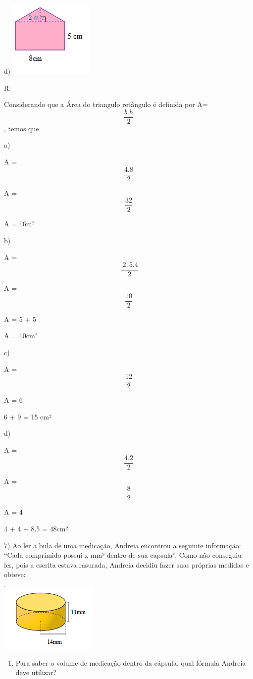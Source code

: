 d)
\includegraphics[width=1.59375in,height=1.46875in]{./imgSAEB_8_MAT/media/image49.png}

R:

Considerando que a Área do triangulo retângulo é definida por A=
\[\frac{b.h}{2}\], temos que

a)

A = \[\frac{4.8}{2}\]

A = \[\frac{32}{2}\]

A = 16m²

b)

A = \[\ \frac{\ 2,5.4}{2}\]

A = \[\frac{10}{2}\]

A = 5 + 5

A = 10cm²

c)

A = \[\frac{12}{2}\]

A = 6

6 + 9 = 15 cm²

d)

A = \[\frac{4.2}{2}\]

A = \[\frac{8}{2}\]

A = 4

4 + 4 + 8.5 = 48cm²

7) Ao ler a bula de uma medicação, Andreia encontrou a seguinte
informação: ``Cada comprimido possui x mm³ dentro de sua capsula''. Como
não conseguiu ler, pois a escrita estava rasurada, Andreia decidiu fazer
suas próprias medidas e obteve:

\includegraphics[width=1.88542in,height=1.3125in]{./imgSAEB_8_MAT/media/image50.png}

\begin{enumerate}
\def\labelenumi{\alph{enumi})}
\tightlist
\item
  Para saber o volume de medicação dentro da cápsula, qual fórmula
  Andreia deve utilizar?
\end{enumerate}

